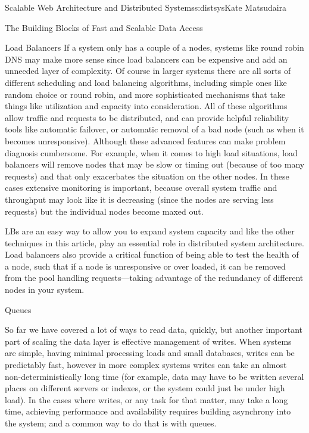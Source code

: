 \begin{aosachapter}{Scalable Web Architecture and Distributed Systems}{s:distsys}{Kate Matsudaira}
\begin{aosasect1}{The Building Blocks of Fast and Scalable Data Access}
\begin{aosasect2}{Load Balancers}
If a system only has a couple of a nodes, systems like round robin DNS
may make more sense since load balancers can be expensive and add an
unneeded layer of complexity. Of course in larger systems there are
all sorts of different scheduling and load balancing algorithms,
including simple ones like random choice or round robin, and more
sophisticated mechanisms that take things like utilization and
capacity into consideration. All of these algorithms allow traffic and
requests to be distributed, and can provide helpful reliability tools
like automatic failover, or automatic removal of a bad node (such as
when it becomes unresponsive). Although these advanced features can
make problem diagnosis cumbersome. For example, when it comes to high
load situations, load balancers will remove nodes that may be slow or
timing out (because of too many requests) and that only exacerbates
the situation on the other nodes. In these cases extensive monitoring
is important, because overall system traffic and throughput may look
like it is decreasing (since the nodes are serving less requests) but
the individual nodes become maxed out.

LBs are an easy way to allow you to expand system capacity and like
the other techniques in this article, play an essential role in
distributed system architecture. Load balancers also provide a
critical function of being able to test the health of a node, such
that if a node is unresponsive or over loaded, it can be removed from
the pool handling requests---taking advantage of the redundancy of
different nodes in your system.

\end{aosasect2}

\begin{aosasect2}{Queues}

So far we have covered a lot of ways to read data, quickly, but
another important part of scaling the data layer is effective
management of writes. When systems are simple, having minimal
processing loads and small databases, writes can be predictably fast,
however in more complex systems writes can take an almost
non-deterministically long time (for example, data may have to be
written several places on different servers or indexes, or the system
could just be under high load). In the cases where writes, or any task
for that matter, may take a long time, achieving performance and
availability requires building asynchrony into the system; and a
common way to do that is with queues.


\end{aosasect2}
\end{aosasect1}
\end{aosachapter}
